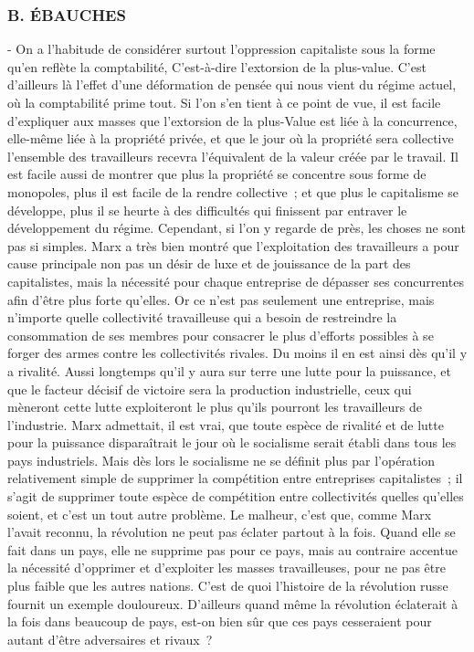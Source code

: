 \documentclass[french,twoside]{book} %
\begin{document}
\subsubsection[B. ÉBAUCHES]{B. ÉBAUCHES}
 - On a l'habitude de considérer surtout l'oppression capitaliste sous la forme qu'en reflète la comptabilité, C'est-à-dire l'extorsion de la plus-value. C'est d'ailleurs là l'effet d'une déformation de pensée qui nous vient du régime actuel, où la comptabilité prime tout. Si l'on s'en tient à ce point de vue, il est facile d'expliquer aux masses que l'extorsion de la plus-Value est liée à la concurrence, elle-même liée à la propriété privée, et que le jour où la propriété sera collective l'ensemble des travailleurs recevra l'équivalent de la valeur créée par le travail. Il est facile aussi de montrer que plus la propriété se concentre sous forme de monopoles, plus il est facile de la rendre collective ; et que plus le capitalisme se développe, plus il se heurte à des difficultés qui finissent par entraver le développement du régime. Cependant, si l'on y regarde de près, les choses ne sont pas si simples. Marx a très bien montré que l'exploitation des travailleurs a pour cause principale non pas un désir de luxe et de jouissance de la part des capitalistes, mais la nécessité pour chaque entreprise de dépasser ses concurrentes afin d'être plus forte qu'elles. Or ce n'est pas seulement une entreprise, mais n'importe quelle collectivité travailleuse qui a besoin de restreindre la consommation de ses membres pour consacrer le plus d'efforts possibles à se forger des armes contre les collectivités rivales. Du moins il en est ainsi dès qu'il y a rivalité. Aussi longtemps qu'il y aura sur terre une lutte pour la puissance, et que le facteur décisif de victoire sera la production industrielle, ceux qui mèneront cette lutte exploiteront le plus qu'ils pourront les travailleurs de l'industrie. Marx admettait, il est vrai, que toute espèce de rivalité et de lutte pour la puissance disparaîtrait le jour où le socialisme serait établi dans tous les pays industriels. Mais dès lors le socialisme ne se définit plus par l'opération relativement simple de supprimer la compétition entre entreprises capitalistes ; il s'agit de supprimer toute espèce de compétition entre collectivités quelles qu'elles soient, et c'est un tout autre problème. Le malheur, c'est que, comme Marx l'avait reconnu, la révolution ne peut pas éclater partout à la fois. Quand elle se fait dans un pays, elle ne supprime pas pour ce pays, mais au contraire accentue la nécessité d'opprimer et d'exploiter les masses travailleuses, pour ne pas être plus faible que les autres nations. C'est de quoi l'histoire de la révolution russe fournit un exemple douloureux. D'ailleurs quand même la révolution éclaterait à la fois dans beaucoup de pays, est-on bien sûr que ces pays cesseraient pour autant d'être adversaires et rivaux ?\par
\end{document}
